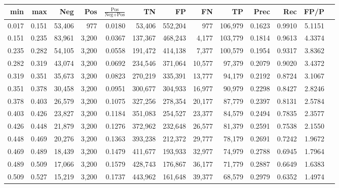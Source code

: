\begin{tabular}{rrrrrrrrrrrrr}
\toprule
  min &   max &    Neg &   Pos & $\frac{\text{Pos}}{\text{Neg}+\text{Pos}}$ &      TN &      FP &      FN &      TP &   Prec &    Rec &   FP/P \\
\midrule
0.017 & 0.151 & 53,406 &   977 &                                     0.0180 &  53,406 & 552,204 &     977 & 106,979 & 0.1623 & 0.9910 & 5.1151 \\
0.151 & 0.235 & 83,961 & 3,200 &                                     0.0367 & 137,367 & 468,243 &   4,177 & 103,779 & 0.1814 & 0.9613 & 4.3374 \\
0.235 & 0.282 & 54,105 & 3,200 &                                     0.0558 & 191,472 & 414,138 &   7,377 & 100,579 & 0.1954 & 0.9317 & 3.8362 \\
0.282 & 0.319 & 43,074 & 3,200 &                                     0.0692 & 234,546 & 371,064 &  10,577 &  97,379 & 0.2079 & 0.9020 & 3.4372 \\
0.319 & 0.351 & 35,673 & 3,200 &                                     0.0823 & 270,219 & 335,391 &  13,777 &  94,179 & 0.2192 & 0.8724 & 3.1067 \\
0.351 & 0.378 & 30,458 & 3,200 &                                     0.0951 & 300,677 & 304,933 &  16,977 &  90,979 & 0.2298 & 0.8427 & 2.8246 \\
0.378 & 0.403 & 26,579 & 3,200 &                                     0.1075 & 327,256 & 278,354 &  20,177 &  87,779 & 0.2397 & 0.8131 & 2.5784 \\
0.403 & 0.426 & 23,827 & 3,200 &                                     0.1184 & 351,083 & 254,527 &  23,377 &  84,579 & 0.2494 & 0.7835 & 2.3577 \\
0.426 & 0.448 & 21,879 & 3,200 &                                     0.1276 & 372,962 & 232,648 &  26,577 &  81,379 & 0.2591 & 0.7538 & 2.1550 \\
0.448 & 0.469 & 20,276 & 3,200 &                                     0.1363 & 393,238 & 212,372 &  29,777 &  78,179 & 0.2691 & 0.7242 & 1.9672 \\
0.469 & 0.489 & 18,439 & 3,200 &                                     0.1479 & 411,677 & 193,933 &  32,977 &  74,979 & 0.2788 & 0.6945 & 1.7964 \\
0.489 & 0.509 & 17,066 & 3,200 &                                     0.1579 & 428,743 & 176,867 &  36,177 &  71,779 & 0.2887 & 0.6649 & 1.6383 \\
0.509 & 0.527 & 15,219 & 3,200 &                                     0.1737 & 443,962 & 161,648 &  39,377 &  68,579 & 0.2979 & 0.6352 & 1.4974 \\

\end{tabular}
